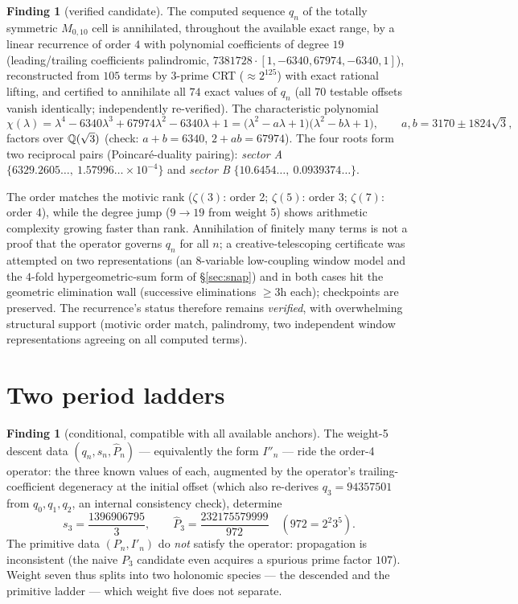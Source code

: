 \documentclass[11pt]{article}
\theoremstyle{definition}\newtheorem{remark}[theorem]{Remark}
\newtheorem{finding}[theorem]{Finding}
\newcommand{\zt}[1]{\zeta(#1)}
\begin{document}
\begin{finding}[verified candidate]\label{find:rec}
The computed sequence $q_n$ of the totally symmetric $M_{0,10}$ cell is
annihilated, throughout the available exact range, by a linear recurrence of
order $4$ with polynomial coefficients of degree $19$
(leading/trailing coefficients palindromic, $7381728\cdot[1,-6340,67974,-6340,1]$),
reconstructed from $105$ terms by $3$-prime CRT ($\approx2^{125}$) with exact
rational lifting, and certified to annihilate all $74$ exact values of $q_n$
(all $70$ testable offsets vanish identically; independently re-verified).
The characteristic polynomial
\[
\chi(\lambda)=\lambda^4-6340\lambda^3+67974\lambda^2-6340\lambda+1
=\bigl(\lambda^2-a\lambda+1\bigr)\bigl(\lambda^2-b\lambda+1\bigr),
\qquad a,b=3170\pm1824\sqrt3,
\]
factors over $\mathbb{Q}(\sqrt3)$ (check: $a+b=6340$, $2+ab=67974$). The four roots
form two reciprocal pairs (Poincar\'e-duality pairing):
\emph{sector A} $\{6329.2605\ldots,\ 1.57996\ldots\times10^{-4}\}$ and
\emph{sector B} $\{10.6454\ldots,\ 0.0939374\ldots\}$.
\end{finding}

The order matches the motivic rank ($\zt3$: order 2; $\zt5$: order 3; $\zt7$:
order 4), while the degree jump ($9\to19$ from weight 5) shows arithmetic
complexity growing faster than rank. Annihilation of finitely many terms is
not a proof that the operator governs $q_n$ for all $n$; a creative-telescoping
certificate was attempted on two representations (an $8$-variable low-coupling
window model and the $4$-fold hypergeometric-sum form of \S\ref{sec:snap}) and
in both cases hit the geometric elimination wall (successive eliminations
$\ge3$h each); checkpoints are preserved. The recurrence's status therefore
remains \emph{verified}, with overwhelming structural support (motivic order
match, palindromy, two independent window representations agreeing on all
computed terms).

\section{Two period ladders}\label{sec:ladders}

\begin{finding}[conditional, compatible with all available anchors]\label{find:ladders}
The weight-5 descent data $(q_n,s_n,\hat P_n)$ --- equivalently the form
$I''_n$ --- ride the order-4 operator: the three known values of each,
augmented by the operator's trailing-coefficient degeneracy at the initial
offset (which also re-derives $q_3=94357501$ from $q_0,q_1,q_2$, an internal
consistency check), determine
\[
s_3=\frac{1396906795}{3},\qquad
\hat P_3=\frac{232175579999}{972}\quad(972=2^2 3^5).
\]
The primitive data $(P_n, I'_n)$ do \emph{not} satisfy the operator:
propagation is inconsistent (the naive $P_3$ candidate even acquires a
spurious prime factor $107$). Weight seven thus splits into two holonomic
species --- the descended and the primitive ladder --- which weight five does
not separate.
\end{finding}
\end{document}
